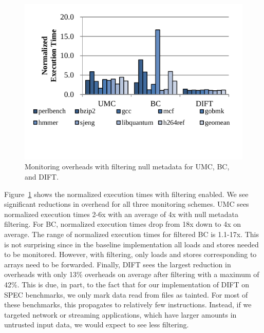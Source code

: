 \begin{figure}
  \begin{center}
    \includegraphics[width=\columnwidth]{figs/data_filtering.pdf}
    \vspace{-0.2in}
    \caption{Monitoring overheads with filtering null metadata for UMC, BC, and DIFT.}
    \label{fig:evaluation.filtering}
    \vspace{-0.1in}
  \end{center}
\end{figure}

Figure~\ref{fig:evaluation.filtering} shows the
normalized execution times with filtering enabled. We see significant
reductions in overhead for all three monitoring schemes. UMC sees normalized
execution times 2-6x with an average of 4x with null metadata filtering. For BC, normalized execution
times drop from 18x down to 4x on average. The range of normalized execution
times for filtered BC is 1.1-17x. This is not surprising since in the baseline
implementation all loads and stores needed to be monitored. However, with
filtering, only loads and stores corresponding to arrays need to be forwarded.
Finally, DIFT sees the largest reduction in overheads with only 13\% overheads
on average after filtering with a maximum of 42\%. This is due, in part, to the fact that
for our implementation of DIFT on SPEC
benchmarks, we only mark data read from files as tainted. For most of these
benchmarks, this propagates to relatively few instructions. Instead, if we
targeted network or streaming applications, which have larger amounts in
untrusted input data, we would expect to see less filtering.

